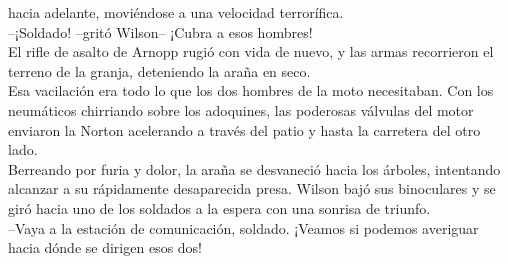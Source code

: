 hacia adelante, moviéndose a una velocidad terrorífica.\\
--¡Soldado! --gritó Wilson-- ¡Cubra a esos hombres!\\
El rifle de asalto de Arnopp rugió con vida de nuevo, y las armas
recorrieron el terreno de la granja, deteniendo la araña en seco.\\
Esa vacilación era todo lo que los dos hombres de la moto necesitaban.
Con los neumáticos chirriando sobre los adoquines, las poderosas
válvulas del motor enviaron la Norton acelerando a través del patio y
hasta la carretera del otro lado.\\
Berreando por furia y dolor, la araña se desvaneció hacia los árboles,
intentando alcanzar a su rápidamente desaparecida presa. Wilson bajó sus
binoculares y se giró hacia uno de los soldados a la espera con una
sonrisa de triunfo.\\
--Vaya a la estación de comunicación, soldado. ¡Veamos si podemos
averiguar hacia dónde se dirigen esos dos!\\
